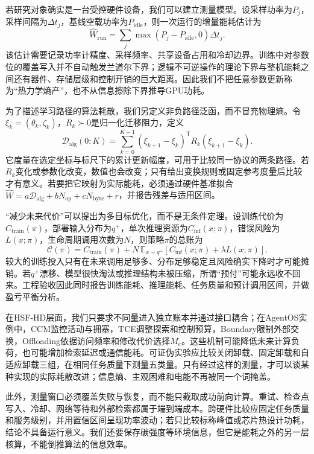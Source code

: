 若研究对象确实是一台受控硬件设备，我们可以建立测量模型。设采样功率为$P_j$，采样间隔为$\Delta t_j$，基线空载功率为$P_{\mathrm{idle}}$，则一次运行的增量能耗估计为
\begin{equation}
\widehat W_{\mathrm{run}}=\sum_j\max(P_j-P_{\mathrm{idle}},0)\Delta t_j.
\end{equation}
该估计需要记录功率计精度、采样频率、共享设备占用和冷却边界。训练中对参数位的覆盖写入并不自动触发兰道尔下界；逻辑不可逆操作的理论下界与整机能耗之间还有器件、存储层级和控制开销的巨大距离。因此我们不把任意参数更新称为“热力学熵产”，也不从信息擦除下界推导GPU功耗。

为了描述学习路径的算法耗散，我们另定义非负路径泛函，而不冒充物理熵。令$\xi_k=(\theta_k,\zeta_k)$，$R_k\succ0$是归一化迁移阻力，定义
\begin{equation}
\mathcal D_{\mathrm{alg}}(0{:}K)=\sum_{k=0}^{K-1}
(\xi_{k+1}-\xi_k)^{\mathsf T}R_k(\xi_{k+1}-\xi_k).
\end{equation}
它度量在选定坐标与标尺下的累计更新幅度，可用于比较同一协议的两条路径。若$R_k$变化或参数化改变，数值也会改变；只有给出变换规则或固定参考度量后比较才有意义。若要把它映射为实际能耗，必须通过硬件基准拟合$\widehat W=a\mathcal D_{\mathrm{alg}}+bN_{\mathrm{op}}+cN_{\mathrm{byte}}+r$，并报告残差与适用区间。

“减少未来代价”可以提出为多目标优化，而不是无条件定理。设训练代价为$C_{\mathrm{train}}(\pi)$，部署输入分布为$q^+$，单次推理资源为$C_{\mathrm{inf}}(x;\pi)$，错误风险为$L(x;\pi)$，生命周期调用次数为$N$，则策略$\pi$的总账为
\begin{equation}
\mathcal C(\pi)=C_{\mathrm{train}}(\pi)+N\,\mathbb E_{x\sim q^+}
[C_{\mathrm{inf}}(x;\pi)+\lambda L(x;\pi)].
\end{equation}
较大的训练投入只有在未来调用足够多、分布足够稳定且风险确实下降时才可能摊销。若$q^+$漂移、模型很快淘汰或推理结构未被压缩，所谓“预付”可能永远收不回来。工程验收因此同时报告训练能耗、推理能耗、任务质量和预计调用区间，并做盈亏平衡分析。

在HSF-HD层面，我们只要求不同量进入独立账本并通过接口耦合；在AgentOS实例中，CCM监控活动与拥塞，TCE调整探索和控制预算，Boundary限制外部交换，Offloading依据访问频率和修改代价选择$M_e$。这些机制可能降低未来计算负荷，也可能增加检索延迟或通信能耗。可证伪实验应比较关闭卸载、固定卸载和自适应卸载三组，在相同任务质量下测量五类量。只有经过这样的测量，才可以谈某种实现的实际耗散改进；信息熵、主观困难和电能不再被同一个词掩盖。

此外，测量窗口必须覆盖失败与恢复，而不能只截取成功前向计算。重试、检查点写入、冷却、网络等待和外部检索都属于端到端成本。跨硬件比较应固定任务质量和服务级别，并用置信区间呈现功率波动；若只比较标称峰值或芯片热设计功耗，结论不具备运行意义。我们还要保存碳强度等环境信息，但它是能耗之外的另一层核算，不能倒推算法的信息效率。

